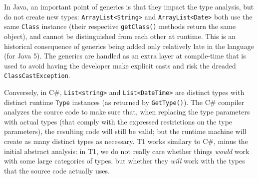 \begin{rationale}
In Java, an important point of generics is that they impact the type
analysis, but do not create new types: \verb|ArrayList<String>| and
\verb|ArrayList<Date>| both use the same \verb|Class| instance (their
respective \verb|getClass()| methods return the same object), and cannot
be distinguished from each other at runtime. This is an historical
consequence of generics being added only relatively late in the language
(for Java 5). The generics are handled as an extra layer at compile-time
that is used to avoid having the developer make explicit casts and risk
the dreaded \verb|ClassCastException|.

Conversely, in C\#, \verb|List<string>| and \verb|List<DateTime>| are
distinct types with distinct runtime \verb|Type| instances (as returned
by \verb|GetType()|). The C\# compiler analyzes the source code to make
sure that, when replacing the type parameters with actual types (that
comply with the expressed restrictions on the type parameters), the
resulting code will still be valid; but the runtime machine will create
as many distinct types as necessary. T1 works similary to C\#, minus the
initial abstract analysis: in T1, we do not really care whether things
\emph{would} work with some large categories of types, but whether they
\emph{will} work with the types that the source code actually uses.
\end{rationale}
